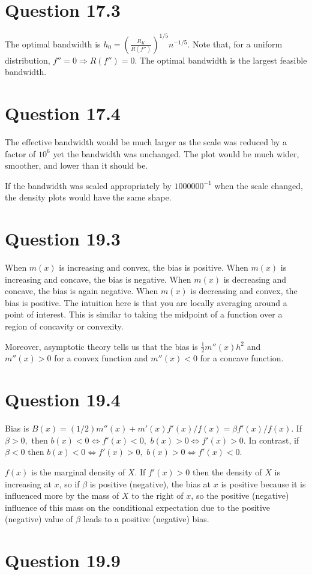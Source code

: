 \documentclass[11pt]{article} %
\begin{document}
\section{Question 17.3}
The optimal bandwidth is $h_0 = \left(\frac{R_K}{R(f'')}\right)^{1/5}n^{-1/5}$. Note that, for a uniform distribution, $f'' = 0 \Rightarrow R(f'') = 0.$ The optimal bandwidth is the largest feasible bandwidth.
\section{Question 17.4}
The effective bandwidth would be much larger as the scale was reduced by a factor of $10^6$ yet the bandwidth was unchanged. The plot would be much wider, smoother, and lower than it should be. 

If the bandwidth was scaled appropriately by $1000000^{-1}$ when the scale changed, the density plots would have the same shape.
\section{Question 19.3}
When $m(x)$ is increasing and convex, the bias is positive. When $m(x)$ is increasing and concave, the bias is negative. When $m(x)$ is decreasing and concave, the bias is again negative. When $m(x)$ is decreasing and convex, the bias is positive. The intuition here is that you are locally averaging around a point of interest. This is similar to taking the midpoint of a function over a region of concavity or convexity.

Moreover, asymptotic theory tells us that the bias is $\frac{1}{2}m''(x)h^2$ and $m''(x)>0$ for a convex function and $m''(x)<0$ for a concave function.
\section{Question 19.4}
Bias is $B(x) = (1/2) m''(x)+ m'(x)f'(x)/f(x) = \beta f'(x)/f(x)$. If $\beta>0,$ then $b(x)<0 \iff f'(x)<0,$ $b(x)>0 \iff f'(x)>0.$ In contrast, if $\beta<0$ then $b(x)<0 \iff f'(x)>0,$ $b(x)>0 \iff f'(x)<0.$

$f(x)$ is the marginal density of $X$. If $f'(x)>0$ then the density of $X$ is increasing at $x$, so if $\beta$ is positive (negative),  the bias at $x$ is positive because it is influenced more by the mass of $X$ to the right of $x$, so the positive (negative) influence of this mass on the conditional expectation due to the positive (negative) value of $\beta$ leads to a positive (negative) bias.
\section{Question 19.9}
\end{document}
